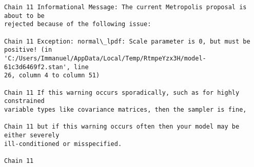 \documentclass[11pt]{article}
\begin{document}
    \begin{Verbatim}[commandchars=\\\{\}]
Chain 11 Informational Message: The current Metropolis proposal is about to be
rejected because of the following issue:

Chain 11 Exception: normal\_lpdf: Scale parameter is 0, but must be positive! (in
'C:/Users/Immanuel/AppData/Local/Temp/RtmpeYzx3H/model-61c3d6469f2.stan', line
26, column 4 to column 51)

Chain 11 If this warning occurs sporadically, such as for highly constrained
variable types like covariance matrices, then the sampler is fine,

Chain 11 but if this warning occurs often then your model may be either severely
ill-conditioned or misspecified.

Chain 11

    \end{Verbatim}
\end{document}
